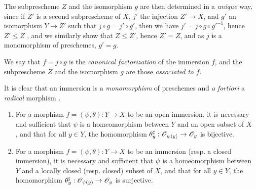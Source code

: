 The subprescheme $Z$ and the isomorphism $g$ are then determined in a \emph{unique} way, since if $Z'$ is a second subprescheme of $X$, $j'$ the injection $Z'\to X$, and $g'$ an isomorphism $Y\to Z'$ such that $j\circ g=j'\circ g'$, then we have $j'=j\circ g\circ{g'}^{-1}$, hence $Z'\leqslant Z$ , and we similarly show that $Z\leqslant Z'$, hence $Z'=Z$, and as $j$ is a monomorphism of preschemes, $g'=g$.

We say that $f=j\circ g$ is the \emph{canonical factorization} of the immersion $f$, and the subprescheme $Z$ and the isomorphism $g$ are those \emph{associated to $f$}.

It is clear that an immersion is a \emph{monomorphism} of preschemes  and \emph{a fortiori} a \emph{radical} morphism .

\begin{prop}[4.2.2]
\label{1.4.2.2}
\medskip\noindent
\begin{enumerate}[label={\rm(\alph*)}]
  \item For a morphism $f=(\psi,\theta):Y\to X$ to be an open immersion, it is necessary and sufficient that $\psi$ is a homeomorphism between $Y$ and an open subset of $X$, and that for all $y\in Y$, the homomorphism $\theta_y^\sharp:\mathscr{O}_{\psi(y)}\to\mathscr{O}_y$ is bijective.
  \item For a morphism $f=(\psi,\theta):Y\to X$ to be an immersion (resp. a closed immersion), it is necessary and sufficient that $\psi$ is a homeomorphism between $Y$ and a locally closed (resp. closed) subset of $X$, and that for all $y\in Y$, the homomorphism $\theta_y^\sharp:\mathscr{O}_{\psi(y)}\to\mathscr{O}_y$ is surjective.
\end{enumerate}
\end{prop}


